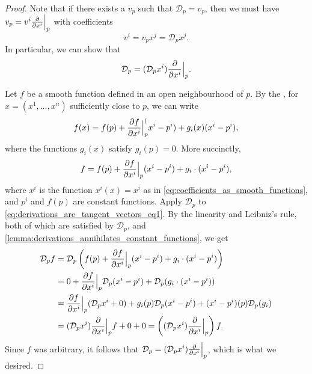 \documentclass[notoc,notitlepage]{tufte-book}
\begin{document}
\begin{proof}
  Note that if there exists a $v_p$ such that $\mathcal{D}_p = v_p$, then we must have
  $v_p = v^i \frac{\partial}{\partial x^i} \Big|_{p}^{}$ with coefficients
  \begin{equation*}
    v^i = v_p x^j = \mathcal{D}_p x^j.
  \end{equation*}
  In particular, we can show that
  \begin{equation*}
    \mathcal{D}_p = (\mathcal{D}_p x^i) \frac{\partial}{\partial x^i} \Big|_{p}^{}.
  \end{equation*}

  Let $f$ be a smooth function defined in an open neighbourhood of $p$. By the , for $x = (x^1, \ldots, x^n)$ sufficiently close to $p$,
  we can write
  \begin{equation*}
    f(x) = f(p) + \frac{\partial f}{\partial x^i} \Big|_{p}^{(}x^i - p^i) + g_i(x) (x^i - p^i),
  \end{equation*}
  where the functions $g_i(x)$ satisfy $g_i(p) = 0$. More succinctly,
  \begin{equation}\label{eq:derivations_are_tangent_vectors_eq1}
    f = f(p) + \frac{\partial f}{\partial x^i} \Big|_{p}^{} (x^i - p^i) + g_i \cdot (x^i - p^i),
  \end{equation}
  where $x^i$ is the function $x^i(x) = x^i$ as in \cref{eq:coefficients_as_smooth_functions},
  and $p^i$ and $f(p)$ are constant functions. Apply $\mathcal{D}_p$ to
  \cref{eq:derivations_are_tangent_vectors_eq1}. By the linearity and Leibniz's rule, both of
  which are satisfied by $\mathcal{D}_p$, and
  \cref{lemma:derivations_annihilates_constant_functions}, we get
  \begin{align*}
    \mathcal{D}_p f
      &= \mathcal{D}_p \left( f(p) + \frac{\partial f}{\partial x^i} \Big|_{p}^{} (x^i - p^i) + g_i \cdot (x^i - p^i) \right) \\
      &= 0 + \frac{\partial f}{\partial x^i} \Big|_{p}^{} \mathcal{D}_p(x^i - p^i)
        + \mathcal{D}_p (g_i \cdot (x^i - p^i)) \\
      &= \frac{\partial f}{\partial x^i} \Big|_{p}^{} (\mathcal{D}_p x^i + 0)
        + g_i(p) \mathcal{D}_p (x^i - p^i) + (x^i - p^i)(p) \mathcal{D}_p (g_i) \\
      &= (\mathcal{D}_p x^i) \frac{\partial}{\partial x^i} \Big|_{p}^{} f + 0 + 0
      = \left( (\mathcal{D}_p x^i) \frac{\partial}{\partial x^i} \Big|_{p}^{} \right) f.
  \end{align*}
  Since $f$ was arbitrary, it follows that
  $\mathcal{D}_p = (\mathcal{D}_p x^i) \frac{\partial}{\partial x^i} \Big|_{p}^{}$,
  which is what we desired.
\end{proof}
\end{document}
